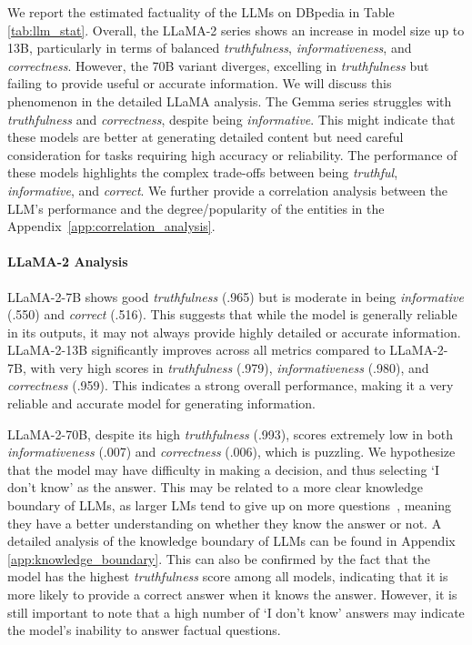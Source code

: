 We report the estimated factuality of the LLMs on DBpedia in Table \ref{tab:llm_stat}. 
Overall, the LLaMA-2 series shows an increase in model size up to 13B, particularly in terms of balanced \textit{truthfulness}, \textit{informativeness}, and \textit{correctness}. However, the 70B variant diverges, excelling in \textit{truthfulness} but failing to provide useful or accurate information. We will discuss this phenomenon in the detailed LLaMA analysis. 
The Gemma series struggles with \textit{truthfulness} and \textit{correctness}, despite being \textit{informative}. This might indicate that these models are better at generating detailed content but need careful consideration for tasks requiring high accuracy or reliability.
The performance of these models highlights the complex trade-offs between being \textit{truthful}, \textit{informative}, and \textit{correct}. 
We further provide a correlation analysis between the LLM's performance and the degree/popularity of the entities in the Appendix~\ref{app:correlation_analysis}.



\paragraph{LLaMA-2 Analysis}
LLaMA-2-7B shows good \textit{truthfulness} (.965) but is moderate in being \textit{informative} (.550) and \textit{correct} (.516). This suggests that while the model is generally reliable in its outputs, it may not always provide highly detailed or accurate information.
LLaMA-2-13B significantly improves across all metrics compared to LLaMA-2-7B, with very high scores in \textit{truthfulness} (.979), \textit{informativeness} (.980), and \textit{correctness} (.959). This indicates a strong overall performance, making it a very reliable and accurate model for generating information.

LLaMA-2-70B, despite its high \textit{truthfulness} (.993), scores extremely low in both \textit{informativeness} (.007) and \textit{correctness} (.006), which is puzzling. 
We hypothesize that the model may have difficulty in making a decision, and thus selecting `I don't know' as the answer. This may be related to a more clear knowledge boundary of LLMs, as larger LMs tend to give up on more questions~\cite{ren2023investigating}, meaning they have a better understanding on whether they know the answer or not. {A detailed analysis of the knowledge boundary of LLMs can be found in Appendix \ref{app:knowledge_boundary}.} This can also be confirmed by the fact that the model has the highest \textit{truthfulness} score among all models, indicating that it is more likely to provide a correct answer when it knows the answer. However, it is still important to note that a high number of `I don't know' answers may indicate the model's inability to answer factual questions. 

